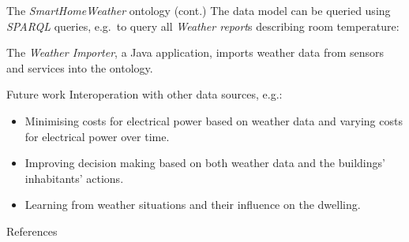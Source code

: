 \documentclass[final,hyperref={pdfpagelabels=true}]{beamer}
\newenvironment{postit}
{\begin{beamercolorbox}[sep=1em,wd=7cm]{postit}}
{\end{beamercolorbox}}
\begin{document}
\begin{frame}[fragile]
\begin{columns}[t]
\begin{column}{.45\textwidth}
\begin{block}{The \emph{SmartHomeWeather} ontology (cont.)}
	The data model can be queried using \emph{SPARQL} queries, e.g.\ to query all \emph{Weather report}s describing room temperature:

	\vspace{10mm}
	\vspace{-12mm}
	
	The \emph{Weather Importer}, a Java application, imports weather data from sensors and services
	into the ontology.
      \end{block}
      
      \begin{block}{Future work}
	Interoperation with other data sources, e.g.:
	\begin{itemize}
	  \item Minimising costs for electrical power based on weather data and varying costs for electrical power over time.
	  \item Improving decision making based on both weather data and the buildings' inhabitants' actions.
	  \item Learning from weather situations and their influence on the dwelling.
	\end{itemize}
      \end{block}

      \begin{block}{References}
        \footnotesize
	
	
      \end{block}
    \end{column}
  \end{columns}

  
\end{frame}
\end{document}

